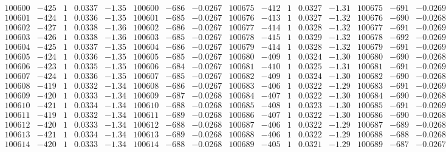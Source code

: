 \documentclass[11pt,reqno,a4letter]{article}
\numberwithin{figure}{section}
\numberwithin{table}{section}
\theoremstyle{plain}
\numberwithin{theorem}{section}
\theoremstyle{definition}
\begin{document}
\begin{table}[ht!]
\begin{equation*}
{\begin{array}{ccccc|ccc||ccccc|ccc}
100600 & -425 & 1 & 0.0337 & -1.35 & 100600 & -686 & -0.0267 & 100675 & -412 & 1 & 0.0327 & -1.31 & 100675 & -691 & -0.0269  \\
100601 & -424 & 1 & 0.0336 & -1.35 & 100601 & -685 & -0.0267 & 100676 & -413 & 1 & 0.0327 & -1.32 & 100676 & -690 & -0.0268  \\
100602 & -427 & 1 & 0.0338 & -1.36 & 100602 & -686 & -0.0267 & 100677 & -414 & 1 & 0.0328 & -1.32 & 100677 & -691 & -0.0269  \\
100603 & -426 & 1 & 0.0338 & -1.36 & 100603 & -685 & -0.0267 & 100678 & -415 & 1 & 0.0329 & -1.32 & 100678 & -692 & -0.0269  \\
100604 & -425 & 1 & 0.0337 & -1.35 & 100604 & -686 & -0.0267 & 100679 & -414 & 1 & 0.0328 & -1.32 & 100679 & -691 & -0.0269  \\
100605 & -424 & 1 & 0.0336 & -1.35 & 100605 & -685 & -0.0267 & 100680 & -409 & 1 & 0.0324 & -1.30 & 100680 & -690 & -0.0268  \\
100606 & -423 & 1 & 0.0335 & -1.35 & 100606 & -684 & -0.0267 & 100681 & -410 & 1 & 0.0325 & -1.31 & 100681 & -691 & -0.0269  \\
100607 & -424 & 1 & 0.0336 & -1.35 & 100607 & -685 & -0.0267 & 100682 & -409 & 1 & 0.0324 & -1.30 & 100682 & -690 & -0.0268  \\
100608 & -419 & 1 & 0.0332 & -1.34 & 100608 & -686 & -0.0267 & 100683 & -406 & 1 & 0.0322 & -1.29 & 100683 & -691 & -0.0269  \\
100609 & -420 & 1 & 0.0333 & -1.34 & 100609 & -687 & -0.0268 & 100684 & -407 & 1 & 0.0322 & -1.30 & 100684 & -690 & -0.0268  \\
100610 & -421 & 1 & 0.0334 & -1.34 & 100610 & -688 & -0.0268 & 100685 & -408 & 1 & 0.0323 & -1.30 & 100685 & -691 & -0.0269  \\
100611 & -419 & 1 & 0.0332 & -1.34 & 100611 & -689 & -0.0268 & 100686 & -407 & 1 & 0.0322 & -1.30 & 100686 & -690 & -0.0268  \\
100612 & -420 & 1 & 0.0333 & -1.34 & 100612 & -688 & -0.0268 & 100687 & -406 & 1 & 0.0322 & -1.29 & 100687 & -689 & -0.0268  \\
100613 & -421 & 1 & 0.0334 & -1.34 & 100613 & -689 & -0.0268 & 100688 & -406 & 1 & 0.0322 & -1.29 & 100688 & -688 & -0.0268  \\
100614 & -420 & 1 & 0.0333 & -1.34 & 100614 & -688 & -0.0268 & 100689 & -405 & 1 & 0.0321 & -1.29 & 100689 & -687 & -0.0267  \\
\end{array}
}
\end{equation*} 

\end{table}
\clearpage 
\end{document}
